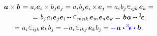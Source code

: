 \begin{multline}
\bm{a} \mathcolor{blue}{\times} \bm{b} \hspace{.2ex}
= \hspace{.1ex} a_i \bm{e}_i \times b_j \bm{e}_j
= \hspace{.1ex} a_i \hspace{.1ex} b_j \bm{e}_i \hspace{-0.2ex} \times \hspace{-0.2ex} \bm{e}_j
= \hspace{.1ex} a_i \hspace{.1ex} b_j \hspace{.1ex} \permutationsparitysymbols{i\hspace{-0.1ex}j\hspace{-0.1ex}k} \hspace{.2ex} \bm{e}_k =
\\[-0.12em]
\shoveright{= \hspace{.2ex} b_j \hspace{.1ex} a_i \hspace{.1ex} \bm{e}_j \bm{e}_i \dotdotp \permutationsparitysymbols{mnk} \hspace{.2ex} \bm{e}_m \bm{e}_n \bm{e}_k
= \hspace{.2ex} \bm{b} \hspace{.1ex} \bm{a} \hspace{.1ex} \dotdotp \permutationsparitytensor \hspace{.1ex} ,}
\\[-0.1em]
= \hspace{.1ex} a_i \hspace{.1ex} \permutationsparitysymbols{i\hspace{-0.1ex}j\hspace{-0.1ex}k} \hspace{.2ex} \bm{e}_k \hspace{.1ex} b_j
= - \hspace{.2ex} a_i \hspace{.1ex} \permutationsparitysymbols{ikj} \hspace{.2ex} \bm{e}_k \hspace{.1ex} b_j
= \mathcolor{blue}{-} \hspace{.2ex} \bm{a} \hspace{.1ex} \mathcolor{blue}{\dotp \permutationsparitytensor \dotp} \hspace{.12ex} \bm{b}
\hspace{.1ex} .
\end{multline}

